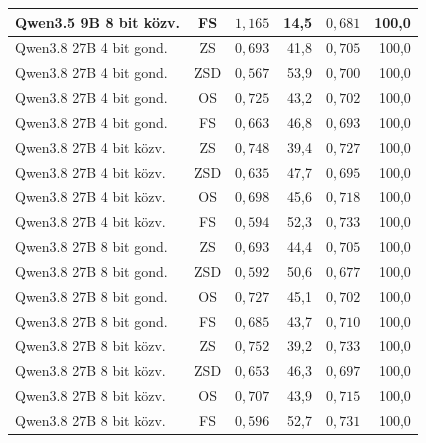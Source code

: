 \documentclass[
]{elteikthesis}[2024/04/26]
\begin{document}
\begin{longtable}{ | l | c | r | r | r | r | }
	\hline
	Qwen3.5 9B 8 bit közv. & FS & $1{,}165$ & 14,5 & $0{,}681$ & 100,0 \\
	\hline
	Qwen3.8 27B 4 bit gond. & ZS & $0{,}693$ & 41,8 & $0{,}705$ & 100,0 \\
	\hline
	Qwen3.8 27B 4 bit gond. & ZSD & $0{,}567$ & 53,9 & $0{,}700$ & 100,0 \\
	\hline
	Qwen3.8 27B 4 bit gond. & OS & $0{,}725$ & 43,2 & $0{,}702$ & 100,0 \\
	\hline
	Qwen3.8 27B 4 bit gond. & FS & $0{,}663$ & 46,8 & $0{,}693$ & 100,0 \\
	\hline
	Qwen3.8 27B 4 bit közv. & ZS & $0{,}748$ & 39,4 & $0{,}727$ & 100,0 \\
	\hline
	Qwen3.8 27B 4 bit közv. & ZSD & $0{,}635$ & 47,7 & $0{,}695$ & 100,0 \\
	\hline
	Qwen3.8 27B 4 bit közv. & OS & $0{,}698$ & 45,6 & $0{,}718$ & 100,0 \\
	\hline
	Qwen3.8 27B 4 bit közv. & FS & $0{,}594$ & 52,3 & $0{,}733$ & 100,0 \\
	\hline
	Qwen3.8 27B 8 bit gond. & ZS & $0{,}693$ & 44,4 & $0{,}705$ & 100,0 \\
	\hline
	Qwen3.8 27B 8 bit gond. & ZSD & $0{,}592$ & 50,6 & $0{,}677$ & 100,0 \\
	\hline
	Qwen3.8 27B 8 bit gond. & OS & $0{,}727$ & 45,1 & $0{,}702$ & 100,0 \\
	\hline
	Qwen3.8 27B 8 bit gond. & FS & $0{,}685$ & 43,7 & $0{,}710$ & 100,0 \\
	\hline
	Qwen3.8 27B 8 bit közv. & ZS & $0{,}752$ & 39,2 & $0{,}733$ & 100,0 \\
	\hline
	Qwen3.8 27B 8 bit közv. & ZSD & $0{,}653$ & 46,3 & $0{,}697$ & 100,0 \\
	\hline
	Qwen3.8 27B 8 bit közv. & OS & $0{,}707$ & 43,9 & $0{,}715$ & 100,0 \\
	\hline
	Qwen3.8 27B 8 bit közv. & FS & $0{,}596$ & 52,7 & $0{,}731$ & 100,0 \\
	\hline
\end{longtable}

\cleardoublepage

{}
\printbibliography[title=\biblabel]
\cleardoublepage
\end{document}
